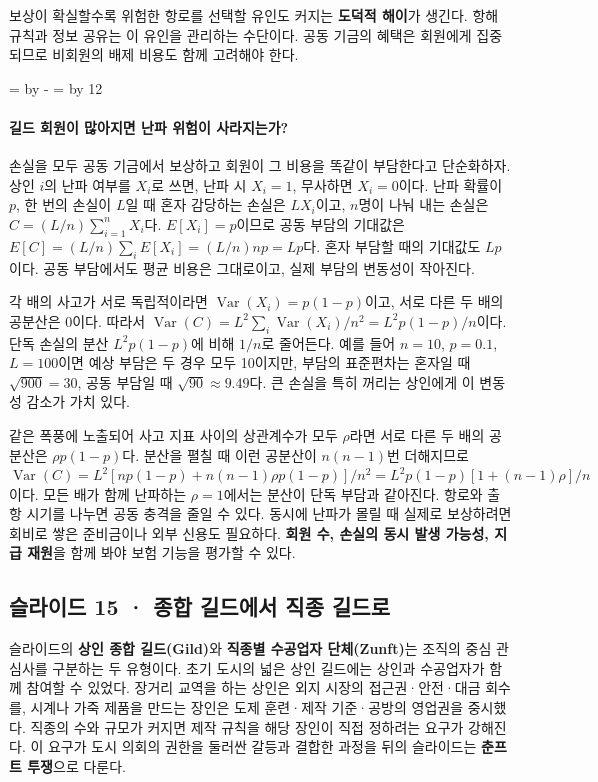 \documentclass[10pt,a4paper]{article}
\newcommand{\ReserveQuestionSpace}{%
  \par\begingroup
  \dimen0=\pagegoal \advance\dimen0 by -\pagetotal
  \dimen2=\baselineskip \multiply\dimen2 by 12
  \ifdim\dimen0<\dimen2 \newpage\fi
  \endgroup}
\begin{document}
보상이 확실할수록 위험한 항로를 선택할 유인도 커지는 \textbf{도덕적 해이}가 생긴다. 항해 규칙과 정보 공유는 이 유인을 관리하는 수단이다. 공동 기금의 혜택은 회원에게 집중되므로 비회원의 배제 비용도 함께 고려해야 한다.\par

\ReserveQuestionSpace
\paragraph{길드 회원이 많아지면 난파 위험이 사라지는가?}

손실을 모두 공동 기금에서 보상하고 회원이 그 비용을 똑같이 부담한다고 단순화하자. 상인 $i$의 난파 여부를 $X_i$로 쓰면, 난파 시 $X_i=1$, 무사하면 $X_i=0$이다. 난파 확률이 $p$, 한 번의 손실이 $L$일 때 혼자 감당하는 손실은 $LX_i$이고, $n$명이 나눠 내는 손실은 $C=(L/n)\sum_{i=1}^{n}X_i$다. $E[X_i]=p$이므로 공동 부담의 기대값은 $E[C]=(L/n)\sum_iE[X_i]=(L/n)np=Lp$다. 혼자 부담할 때의 기대값도 $Lp$이다. 공동 부담에서도 평균 비용은 그대로이고, 실제 부담의 변동성이 작아진다.\par

각 배의 사고가 서로 독립적이라면 $\operatorname{Var}(X_i)=p(1-p)$이고, 서로 다른 두 배의 공분산은 0이다. 따라서 $\operatorname{Var}(C)=L^2\sum_i\operatorname{Var}(X_i)/n^2=L^2p(1-p)/n$이다. 단독 손실의 분산 $L^2p(1-p)$에 비해 $1/n$로 줄어든다. 예를 들어 $n=10$, $p=0.1$, $L=100$이면 예상 부담은 두 경우 모두 10이지만, 부담의 표준편차는 혼자일 때 $\sqrt{900}=30$, 공동 부담일 때 $\sqrt{90}\approx9.49$다. 큰 손실을 특히 꺼리는 상인에게 이 변동성 감소가 가치 있다.\par

같은 폭풍에 노출되어 사고 지표 사이의 상관계수가 모두 $\rho$라면 서로 다른 두 배의 공분산은 $\rho p(1-p)$다. 분산을 펼칠 때 이런 공분산이 $n(n-1)$번 더해지므로 $\operatorname{Var}(C)=L^2[n p(1-p)+n(n-1)\rho p(1-p)]/n^2=L^2p(1-p)[1+(n-1)\rho]/n$이다. 모든 배가 함께 난파하는 $\rho=1$에서는 분산이 단독 부담과 같아진다. 항로와 출항 시기를 나누면 공동 충격을 줄일 수 있다. 동시에 난파가 몰릴 때 실제로 보상하려면 회비로 쌓은 준비금이나 외부 신용도 필요하다. \textbf{회원 수, 손실의 동시 발생 가능성, 지급 재원}을 함께 봐야 보험 기능을 평가할 수 있다.\par

\subsection{슬라이드 15 · 종합 길드에서 직종 길드로}
슬라이드의 \textbf{상인 종합 길드(Gild)}와 \textbf{직종별 수공업자 단체(Zunft)}는 조직의 중심 관심사를 구분하는 두 유형이다. 초기 도시의 넓은 상인 길드에는 상인과 수공업자가 함께 참여할 수 있었다. 장거리 교역을 하는 상인은 외지 시장의 접근권·안전·대금 회수를, 시계나 가죽 제품을 만드는 장인은 도제 훈련·제작 기준·공방의 영업권을 중시했다. 직종의 수와 규모가 커지면 제작 규칙을 해당 장인이 직접 정하려는 요구가 강해진다. 이 요구가 도시 의회의 권한을 둘러싼 갈등과 결합한 과정을 뒤의 슬라이드는 \textbf{춘프트 투쟁}으로 다룬다.\par
\end{document}
